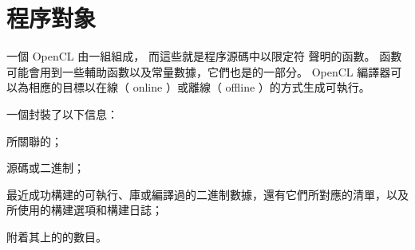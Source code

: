 \section{程序對象}

一個 OpenCL 由一組組成，
而這些就是程序源碼中以限定符  聲明的函數。
  函數可能會用到一些輔助函數以及常量數據，它們也是的一部分。
 OpenCL 編譯器可以為相應的目標以{\ftEmp 在線}（ {\ftEmp online} ）或{\ftEmp 離線}（ {\ftEmp offline} ）的方式生成可執行。

一個封裝了以下信息：
\startigBase
\item 所關聯的；
\item {}源碼或二進制；
\item 最近成功構建的可執行、庫或編譯過的二進制數據，還有它們所對應的清單，以及所使用的構建選項和構建日誌；
\item 附着其上的的數目。
\stopigBase










